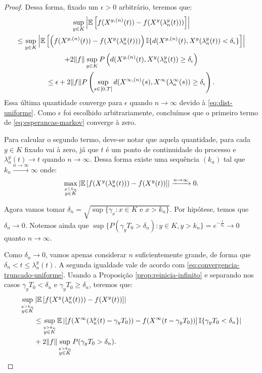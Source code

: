\begin{proof}
  Dessa forma, fixado um $\epsilon > 0$ arbitrário, teremos que:
  \begin{gather*}
    \sup_{y\in K} \left\lvert {\mathbb{E}} \left[ f(X^{y,(n)}(t)) -
        f(X^{y}(\lambda_n^y(t))) \right]
    \right\rvert\\
    \leq \sup_{y\in K} \left\lvert {\mathbb{E}} \left[ \left(f(X^{y,(n)}(t)) -
          f(X^{y}(\lambda_n^y(t))) \right) {\mathbb{I}}\{ d(X^{y, (n)}(t),
        X^y(\lambda_n^y(t)) < \delta_\epsilon \} \right]
    \right\rvert \\
    + 2\Vert f \Vert \sup_{y \in K} P\left( d(X^{y, (n)}(t),
      X^y(\lambda_n^y(t)) \geq
      \delta_\epsilon \right) \\
    \leq \epsilon + 2 \Vert f \Vert P \left( \sup_{s \in [0,
        T]}d(X^{\infty, (n)}(s), X^\infty(\lambda_n^\infty(s)) \geq
      \delta_\epsilon \right).
  \end{gather*}
  Essa última quantidade converge para $\epsilon$ quando $n\to \infty$
  devido à \eqref{eq:dist-uniforme}. Como $\epsilon$ foi escolhido
  arbitrariamente, concluímos que o primeiro termo de
  \eqref{eq:esperancas-markov} converge à zero.

  Para calcular o segundo termo, deve-se notar que aquela quantidade,
  para cada $y \in K$ fixado vai à zero, já que $t$ é \qc um ponto de
  continuidade do processo e $\lambda_n^y(t) \to t$ quando
  $n\to\infty$. Dessa forma existe uma sequência $(k_n)$ tal que $k_n
  \xrightarrow{n\to\infty} \infty$ onde:
  \begin{displaymath}
      \max_{\stackrel{y \leq k_n}{y\in K}} \left\lvert
      {\mathbb{E}} \left[f(X^y(\lambda_n^y(t))) - f(X^y(t)) \right]
    \right\rvert \xrightarrow{n\to \infty} 0.
  \end{displaymath}

  Agora vamos tomar $\delta_n = \sqrt{\sup\{ \gamma_x: x \in K
    \textrm{ e } x > k_n\}}$. Por hipótese, temos que $\delta_n \to
  0$. Notemos ainda que $\sup \{ P(\gamma_y T_0 > \delta_n) : y \in K, y
  > k_n \} = e^{-\frac{1}{\delta_n}} \to 0$ quanto $n \to \infty$.

  Como $\delta_n \to 0$, vamos apenas considerar $n$ suficientemente
  grande, de forma que $\delta_n < t \leq \lambda_n^y(t)$. A segunda
  igualdade vale de acordo com
  \eqref{eq:convergencia-truncado-uniforme}. Usando a Proposição
  \ref{prop:reinicia-infinito} e separando nos casos $\gamma_yT_0 <
  \delta_n$ e $\gamma_yT_0 \geq \delta_n$, teremos que:
  \begin{align}
    \label{eq:markov-quase-la}
    \sup_{\stackrel{y > k_n}{y \in K}}& \left\lvert {\mathbb{E}} \left[f(X^y(\lambda_n^y(t))) -
        f(X^y(t)) \right]
    \right\rvert \notag \\
    &\leq \sup_{\stackrel{y > k_n}{y \in K}} {\mathbb{E}} \left\lvert
      \left[f(X^\infty(\lambda_n^y(t)-\gamma_yT_0)) -
        f(X^\infty(t-\gamma_yT_0)) \right] {\mathbb{I}}\{ \gamma_yT_0 <
      \delta_n \}
    \right\rvert\\
    &+ 2 \Vert f \Vert \sup_{\stackrel{y > k_n}{y \in K}} P(\gamma_y T_0 > \delta_n).
    \notag
  \end{align}


\end{proof}

